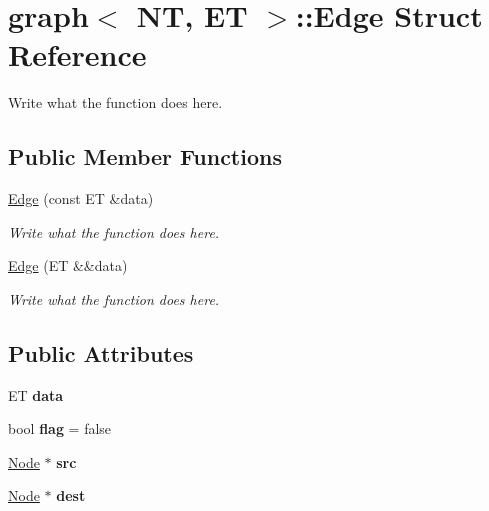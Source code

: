 \hypertarget{structgraph_1_1Edge}{\section{graph$<$ N\+T, E\+T $>$\+:\+:Edge Struct Reference}
\label{structgraph_1_1Edge}
}


Write what the function does here.  


\subsection*{Public Member Functions}
\begin{DoxyCompactItemize}
\item 
\hyperlink{structgraph_1_1Edge_aa987146abe580e5d724db07563006fd7}{Edge} (const E\+T \&data)
\begin{DoxyCompactList}\small\item\em Write what the function does here. \end{DoxyCompactList}\item 
\hyperlink{structgraph_1_1Edge_af7c871c04c3b03d7e662b950a8875b24}{Edge} (E\+T \&\&data)
\begin{DoxyCompactList}\small\item\em Write what the function does here. \end{DoxyCompactList}\end{DoxyCompactItemize}
\subsection*{Public Attributes}
\begin{DoxyCompactItemize}
\item 
\hypertarget{structgraph_1_1Edge_a7246ba3c6e705b5c6ed7eb962b176865}{E\+T {\bfseries data}}\label{structgraph_1_1Edge_a7246ba3c6e705b5c6ed7eb962b176865}

\item 
\hypertarget{structgraph_1_1Edge_a085a367bde22ae09df61053b65b74e06}{bool {\bfseries flag} = false}\label{structgraph_1_1Edge_a085a367bde22ae09df61053b65b74e06}

\item 
\hypertarget{structgraph_1_1Edge_a2609ad21889bbbc55d3425c7aee93d16}{\hyperlink{structgraph_1_1Node}{Node} $\ast$ {\bfseries src}}\label{structgraph_1_1Edge_a2609ad21889bbbc55d3425c7aee93d16}

\item 
\hypertarget{structgraph_1_1Edge_a475664df847e04dc79a93140fd55ca64}{\hyperlink{structgraph_1_1Node}{Node} $\ast$ {\bfseries dest}}\label{structgraph_1_1Edge_a475664df847e04dc79a93140fd55ca64}

\end{DoxyCompactItemize}


